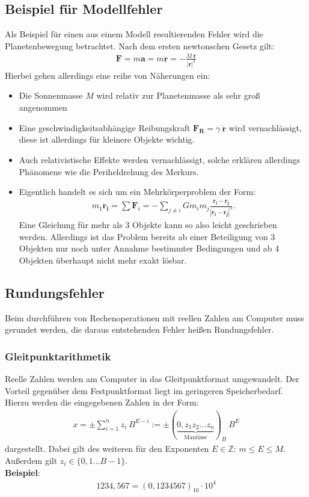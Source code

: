 \documentclass{scrartcl}
\begin{document}
\subsection{Beispiel für Modellfehler}
Als Beispiel für einen aus einem Modell resultierenden Fehler wird die Planetenbewegung betrachtet. Nach dem ersten newtonschen Gesetz gilt:
\begin{align*}
\textbf{F}=m \textbf{a}=m \boldsymbol{\ddot{r}}=-\frac{M \ \textbf{r}}{|\textbf{r}|^3}
\end{align*}
Hierbei gehen allerdings eine reihe von Näherungen ein:
\begin{itemize}
\item Die Sonnenmasse $M$ wird relativ zur Planetenmasse als sehr groß angenommen
\item Eine geschwindigkeitsabhängige Reibungskraft $\boldsymbol{F_R}=\gamma \ \boldsymbol{\dot{r}}$ wird vernachlässigt, diese ist allerdings für kleinere Objekte wichtig.
\item Auch relativistische Effekte werden vernachlässigt, solche erklären allerdings Phänomene wie die Periheldrehung des Merkurs.
\item Eigentlich handelt es sich um ein Mehrkörperproblem der Form:
\begin{align*}
m_1 \boldsymbol{\ddot{r_i}}=\sum \boldsymbol F_i=- \sum_{j\neq i} G m_i m_j \frac{\boldsymbol{r_i}-\boldsymbol{r_j}}{|\boldsymbol{r_i}-\boldsymbol{r_j}|^3}.
\end{align*}
Eine Gleichung für mehr als 3 Objekte kann so also leicht geschrieben werden.
Allerdings ist das Problem bereits ab einer Beteiligung von 3 Objekten nur noch unter Annahme bestimmter Bedingungen und ab 4 Objekten überhaupt nicht mehr exakt lösbar.
\end{itemize}

\subsection{Rundungsfehler}
Beim durchführen von Rechenoperationen mit reellen Zahlen am Computer muss gerundet werden, die daraus entstehenden Fehler heißen Rundungsfehler. 
\subsubsection{Gleitpunktarithmetik}
Reelle Zahlen werden am Computer in das Gleitpunktformat umgewandelt.
Der Vorteil gegenüber dem Festpunktformat liegt im geringeren Speicherbedarf.
Hierzu werden die eingegebenen Zahlen in der Form:
\begin{align*}
x=\pm \sum_{i=1}^n z_i \ B^{E-i} := \pm (\underbrace{0,z_1 z_2 ... z_n}_\text{Mantisse})_B \ B^E 
\end{align*}
dargestellt.
Dabei gilt des weiteren für den Exponenten $E \in \mathbb{Z}$: $m \le E \le M$.
Außerdem gilt $z_i \in \{0,1...B-1\}$. \\
\textbf{Beispiel}:\\
\begin{align*}
1234,567=(0,1234567)_{10} \cdot 10^4
\end{align*}
\end{document}
